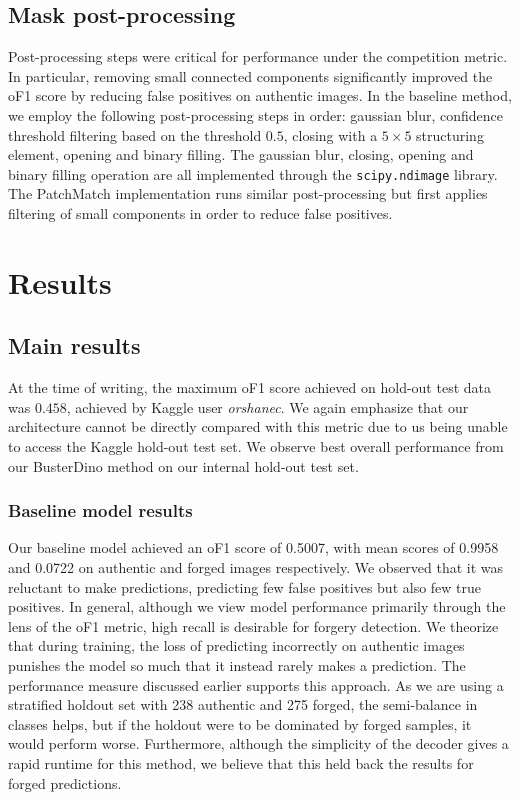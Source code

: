 \documentclass[final]{nldl}
\begin{document}
\subsection{Mask post-processing}
Post-processing steps were critical for performance under the competition metric. In particular, removing small connected components significantly improved the oF1 score by reducing false positives on authentic images. In the baseline method, we employ the following post-processing steps in order: gaussian blur, confidence threshold filtering based on the threshold $0.5$, closing with a $5 \times 5$ structuring element, opening and binary filling. The gaussian blur, closing, opening and binary filling operation are all implemented through the \texttt{scipy.ndimage} library. The PatchMatch implementation runs similar post-processing but first applies filtering of small components in order to reduce false positives.
\section{Results}
\subsection{Main results}
At the time of writing, the maximum oF1 score achieved on hold-out test data was $0.458$, achieved by Kaggle user \emph{orshanec}. \cite{kaggle} We again emphasize that our architecture cannot be directly compared with this metric due to us being unable to access the Kaggle hold-out test set. We observe best overall performance from our BusterDino method on our internal hold-out test set.
\subsubsection{Baseline model results}
Our baseline model achieved an oF1 score of 0.5007, with mean scores of 0.9958 and 0.0722 on authentic and forged images respectively.  We observed that it was reluctant to make predictions, predicting few false positives but also few true positives. In general, although we view model performance primarily through the lens of the oF1 metric, high recall is desirable for forgery detection. We theorize that during training, the loss of predicting incorrectly on authentic images punishes the model so much that it instead rarely makes a prediction. The performance measure discussed earlier supports this approach. As we are using a stratified holdout set with 238 authentic and 275 forged, the semi-balance in classes helps, but if the holdout were to be dominated by forged samples, it would perform worse. Furthermore, although the simplicity of the decoder gives a rapid runtime for this method, we believe that this held back the results for forged predictions.
\end{document}

